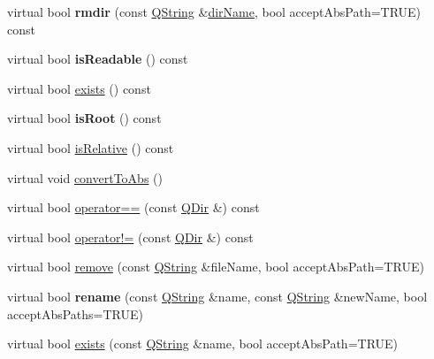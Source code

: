 \begin{DoxyCompactItemize}
\mbox{\label{class_q_dir_a2beff32425619f8ed670fda71bf90e08}} 
virtual bool {\bfseries rmdir} (const \mbox{\hyperlink{class_q_string}{Q\+String}} \&\mbox{\hyperlink{class_q_dir_a2c904d64a7194a57ee583d111cbbdeff}{dir\+Name}}, bool accept\+Abs\+Path=T\+R\+UE) const
\item 
\mbox{\label{class_q_dir_aed0134427cd1bde71866bd1b1f8a71d3}} 
virtual bool {\bfseries is\+Readable} () const
\item 
virtual bool \mbox{\hyperlink{class_q_dir_a97e8132d482e374745230de942def208}{exists}} () const
\item 
\mbox{\label{class_q_dir_af300c57635f696448f937e7ad4c9cf56}} 
virtual bool {\bfseries is\+Root} () const
\item 
virtual bool \mbox{\hyperlink{class_q_dir_a2b420c4c2e7b5764ab1fb35e37d1726f}{is\+Relative}} () const
\item 
virtual void \mbox{\hyperlink{class_q_dir_a0c05c8978b3b4158233f809e4d30c55d}{convert\+To\+Abs}} ()
\item 
virtual bool \mbox{\hyperlink{class_q_dir_a90ac5c24900d96f7966839bc81d59450}{operator==}} (const \mbox{\hyperlink{class_q_dir}{Q\+Dir}} \&) const
\item 
virtual bool \mbox{\hyperlink{class_q_dir_afafc50dc4abc02aeeaccdcf41b9b734e}{operator!=}} (const \mbox{\hyperlink{class_q_dir}{Q\+Dir}} \&) const
\item 
virtual bool \mbox{\hyperlink{class_q_dir_aca44a22e3f1355bc74fdd96e0af052c9}{remove}} (const \mbox{\hyperlink{class_q_string}{Q\+String}} \&file\+Name, bool accept\+Abs\+Path=T\+R\+UE)
\item 
\mbox{\label{class_q_dir_a403c5efd21e686cadee2cf4d7059ab19}} 
virtual bool {\bfseries rename} (const \mbox{\hyperlink{class_q_string}{Q\+String}} \&name, const \mbox{\hyperlink{class_q_string}{Q\+String}} \&new\+Name, bool accept\+Abs\+Paths=T\+R\+UE)
\item 
virtual bool \mbox{\hyperlink{class_q_dir_a83bb64d2d9e4f7bf0d9d9d0896165be6}{exists}} (const \mbox{\hyperlink{class_q_string}{Q\+String}} \&name, bool accept\+Abs\+Path=T\+R\+UE)
\end{DoxyCompactItemize}
